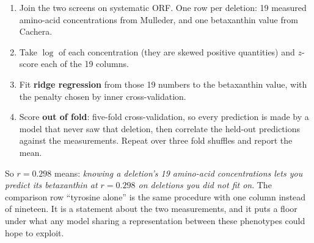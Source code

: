 \begin{enumerate}
\item Join the two screens on systematic ORF. One row per deletion: 19 measured amino-acid
  concentrations from Mulleder, and one betaxanthin value from Cachera.
\item Take $\log$ of each concentration (they are skewed positive quantities) and
  $z$-score each of the 19 columns.
\item Fit \textbf{ridge regression} from those 19 numbers to the betaxanthin value, with
  the penalty chosen by inner cross-validation.
\item Score \textbf{out of fold}: five-fold cross-validation, so every prediction is made
  by a model that never saw that deletion, then correlate the held-out predictions against
  the measurements. Repeat over three fold shuffles and report the mean.
\end{enumerate}

So $r = 0.298$ means: \emph{knowing a deletion's 19 amino-acid concentrations lets you
predict its betaxanthin at $r = 0.298$ on deletions you did not fit on}. The comparison row
``tyrosine alone'' is the same procedure with one column instead of nineteen. It is a
statement about the two measurements, and it puts a floor under what any model sharing a
representation between these phenotypes could hope to exploit.


